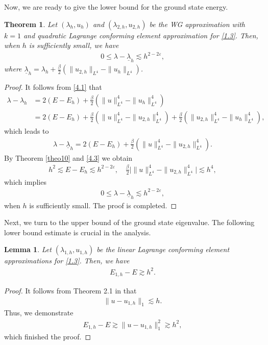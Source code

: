 \documentclass[compress, preprint,9pt]{elsarticle}
\numberwithin{equation}{section}
\newtheorem{lemma}{Lemma}[section]
\newtheorem{theo}{Theorem}[section]
\newcommand{\eps}{\varepsilon}
\begin{document}
Now, we are ready to give the lower bound for the ground state energy.
\begin{theo}
	Let $(\lambda_h,u_h)$ and $(\lambda_{2,h},u_{2,h})$ be the WG approximation with $k=1$ and quadratic Lagrange conforming element approximation for \eqref{1.3}. Then, when $h$ is sufficiently small, we have
	\begin{eqnarray*}
		0\le\lambda-\underline{\lambda}_h\lesssim h^{2-2\eps},
	\end{eqnarray*}
	where $\underline{\lambda}_h=\lambda_h+\frac{\beta}{2}(\|u_{2,h}\|_{L^4}-\|u_h\|_{L^4})$.
\end{theo}
\begin{proof}
	It follows from \eqref{4.1} that
	\begin{eqnarray*}
		\lambda-\lambda_h&=2(E-E_h)+\frac{\beta}{2}(\|u\|_{L^4}^4-\|u_h\|_{L^4}^4)
		\\
		&=2(E-E_h)+\frac{\beta}{2}(\|u\|_{L^4}^4-\|u_{2,h}\|_{L^4}^4)+\frac{\beta}{2}(\|u_{2,h}\|_{L^4}^4-\|u_h\|_{L^4}^4),
	\end{eqnarray*}
	which leads to
	\begin{eqnarray*}
		\lambda-\underline{\lambda}_h= 2(E-E_h)+\frac{\beta}{2}(\|u\|_{L^4}^4-\|u_{2,h}\|_{L^4}^4).
	\end{eqnarray*}
	By Theorem \ref{theo10} and \eqref{4.3} we obtain
	\begin{eqnarray*}
		h^2\lesssim E-E_h\lesssim h^{2-2\eps},\quad \frac{\beta}{2}\big|\|u\|_{L^4}^4-\|u_{2,h}\|_{L^4}^4\big|\lesssim h^4,
	\end{eqnarray*}
	which implies
	\begin{eqnarray*}
		0\le\lambda-\underline{\lambda}_h\lesssim h^{2-2\eps},
	\end{eqnarray*}
	when $h$ is sufficiently small. The proof is completed. 
\end{proof}



Next, we turn to the upper bound of the ground state eigenvalue. The following lower bound estimate is crucial in the analysis.
\begin{lemma}\label{lem11}
	Let $(\lambda_{1,h},u_{1,h})$ be the linear Lagrange conforming element approximations for \eqref{1.3}. Then, we have
	\begin{eqnarray*}
		E_{1,h}-E\gtrsim h^{2}.
	\end{eqnarray*}
\end{lemma}
\begin{proof}
	It follows from Theorem 2.1 in \cite{Lin2013c} that
	\begin{eqnarray*}
		\|u-u_{1,h}\|_1\lesssim h.
	\end{eqnarray*}
	Thus, we demonstrate
	\begin{eqnarray*}
		E_{1,h}-E\gtrsim \|u-u_{1,h}\|_1^2\gtrsim h^{2},
	\end{eqnarray*}
	which finished the proof.
\end{proof}
\end{document}
